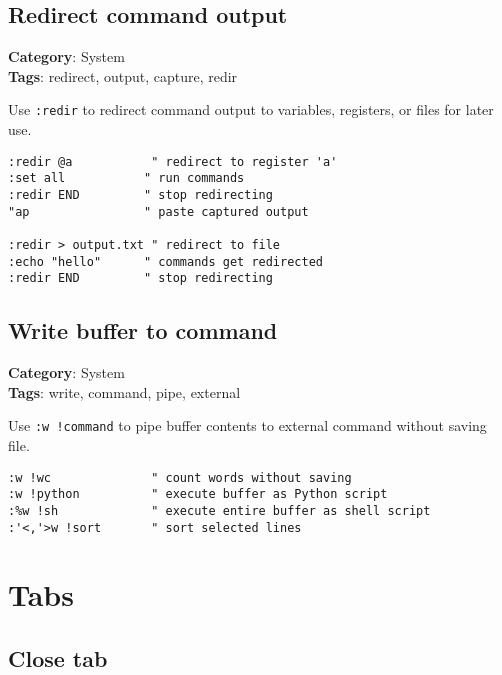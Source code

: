 {{{{{{{{{{{{{{\section{Redirect command output}

\textbf{Category}: System\\ \textbf{Tags}: redirect, output, capture, redir
\vspace{0.5cm}

Use {\footnotesize \Verb§:redir§} to redirect command output to variables, registers, or files for later use.

\begin{Exa*}{}
\begin{Verbatim}[fontsize=\footnotesize, breaklines, breakanywhere]
:redir @a           " redirect to register 'a'
:set all           " run commands
:redir END         " stop redirecting
"ap                " paste captured output

:redir > output.txt " redirect to file
:echo "hello"      " commands get redirected
:redir END         " stop redirecting
\end{Verbatim}
\end{Exa*}

\section{Write buffer to command}

\textbf{Category}: System\\ \textbf{Tags}: write, command, pipe, external
\vspace{0.5cm}

Use {\footnotesize \Verb§:w !command§} to pipe buffer contents to external command without saving file.

\begin{Exa*}{}
\begin{Verbatim}[fontsize=\footnotesize, breaklines, breakanywhere]
:w !wc              " count words without saving
:w !python          " execute buffer as Python script
:%w !sh             " execute entire buffer as shell script
:'<,'>w !sort       " sort selected lines
\end{Verbatim}
\end{Exa*}

\chapter{Tabs}
\section{Close tab}

}}}}}}}}}}}}}}
